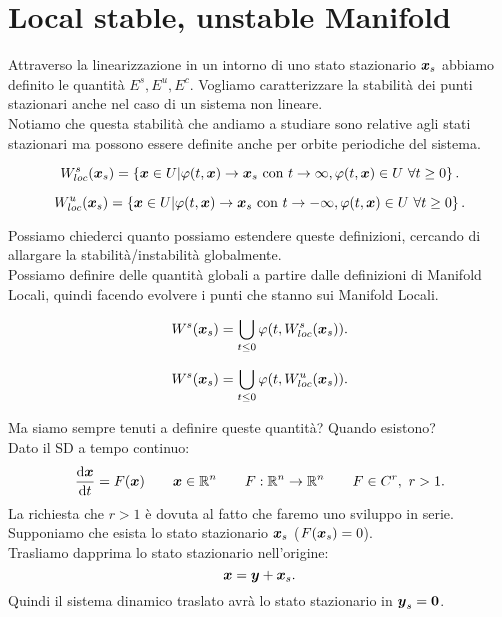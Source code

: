 \section{Local stable, unstable Manifold}%
\label{sub:Local stable, unstable Manifold}
Attraverso la linearizzazione in un intorno di uno stato stazionario $\boldsymbol{x}_s$ abbiamo definito le quantità $E^s, E^u, E^c$. Vogliamo caratterizzare la stabilità dei punti stazionari anche nel caso di un sistema non lineare. \\
Notiamo che questa stabilità che andiamo a studiare sono relative agli stati stazionari ma possono essere definite anche per orbite periodiche del sistema.
\begin{defn}
    \[
	W_{loc}^s(\boldsymbol{x}_s) = \left\{\boldsymbol{x}\in U | \varphi (t, \boldsymbol{x}) \to \boldsymbol{x}_s \text{ con } t\to \infty
	, \varphi (t, \boldsymbol{x}) \in U \ \forall t \ge 0\right\}
    .\] 
\end{defn}
\begin{defn}
    \[
	W_{loc}^u(\boldsymbol{x}_s) = \left\{\boldsymbol{x}\in U | \varphi (t, \boldsymbol{x}) \to \boldsymbol{x}_s \text{ con } t\to -\infty
	, \varphi (t, \boldsymbol{x}) \in U \ \forall t \ge 0\right\}
    .\] 
\end{defn}
\noindent
Possiamo chiederci quanto possiamo estendere queste definizioni, cercando di allargare la stabilità/instabilità globalmente. \\
Possiamo definire delle quantità globali a partire dalle definizioni di Manifold Locali, quindi facendo evolvere i punti che stanno sui Manifold Locali. 
\begin{defn}
    \[
	W^s(\boldsymbol{x}_s) = \bigcup_{t\le 0}\varphi (t, W_{loc}^s(\boldsymbol{x}_s))
    .\] 
\end{defn}
\begin{defn}
    \[
	W^s(\boldsymbol{x}_s) = \bigcup_{t\le 0}\varphi (t, W_{loc}^u(\boldsymbol{x}_s))
    .\] 
\end{defn}
\noindent
Ma siamo sempre tenuti a definire queste quantità? Quando esistono?\\
Dato il SD a tempo continuo:
\[
    \frac{\text{d} \boldsymbol{x}}{\text{d} t} = F(\boldsymbol{x}) \qquad  \boldsymbol{x}\in \mathbb{R}^n \qquad  F:\mathbb{R}^n\to \mathbb{R}^n 
    \qquad  F\in C^r, \ r > 1
.\] 
La richiesta che $r>1$ è dovuta al fatto che faremo uno sviluppo in serie. Supponiamo che esista lo stato stazionario $\boldsymbol{x}_s$ ($F(\boldsymbol{x}_s) = 0$). \\
Trasliamo dapprima lo stato stazionario nell'origine:
\[
    \boldsymbol{x} = \boldsymbol{y}+\boldsymbol{x}_s
.\] 
Quindi il sistema dinamico traslato avrà lo stato stazionario in $\boldsymbol{y}_s=\boldsymbol{0}$.
